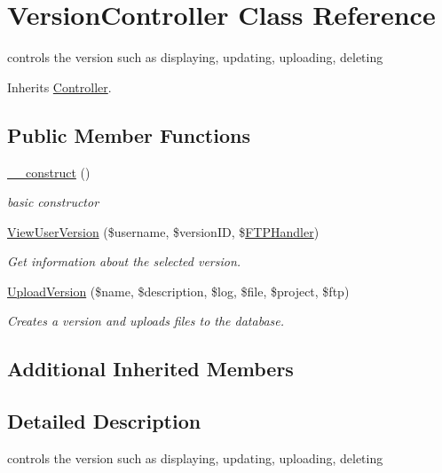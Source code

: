 \hypertarget{class_version_controller}{}\section{Version\+Controller Class Reference}
\label{class_version_controller}


controls the version such as displaying, updating, uploading, deleting  




Inherits \hyperlink{class_controller}{Controller}.

\subsection*{Public Member Functions}
\begin{DoxyCompactItemize}
\item 
\hyperlink{class_version_controller_a095c5d389db211932136b53f25f39685}{\+\_\+\+\_\+construct} ()
\begin{DoxyCompactList}\small\item\em basic constructor \end{DoxyCompactList}\item 
\hyperlink{class_version_controller_a0ae8a4c6c6d71907910bc38278ef1779}{View\+User\+Version} (\$username, \$version\+ID, \$\hyperlink{class_f_t_p_handler}{F\+T\+P\+Handler})
\begin{DoxyCompactList}\small\item\em Get information about the selected version. \end{DoxyCompactList}\item 
\hyperlink{class_version_controller_a0c7a5c23984dfdfbda1320c4dbb834fc}{Upload\+Version} (\$name, \$description, \$log, \$file, \$project, \$ftp)
\begin{DoxyCompactList}\small\item\em Creates a version and uploads files to the database. \end{DoxyCompactList}\end{DoxyCompactItemize}
\subsection*{Additional Inherited Members}


\subsection{Detailed Description}
controls the version such as displaying, updating, uploading, deleting 

